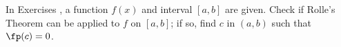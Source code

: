 {\noindent In Exercises}
{, a function $f(x)$ and interval $[a,b]$ are given. Check if Rolle's Theorem can be applied to $f$ on $[a,b]$; if so, find $c$ in $(a,b)$ such that $\fp(c)=0$.}
